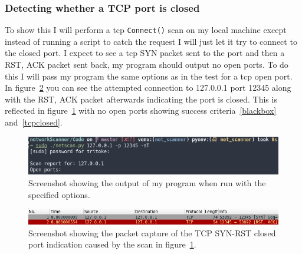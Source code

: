 \documentclass[titlepage]{article}
\let\Oldsubsubsection\subsubsection{}
\renewcommand{\subsubsection}{\FloatBarrier\Oldsubsubsection}
\begin{document}
\subsubsection{Detecting whether a TCP port is closed}
To show this I will perform a \gls{tcp} \verb|Connect()| scan
on my local machine except instead of running a script to catch the
request I will just let it try to connect to the closed port.
I expect to see a \gls{tcp} SYN packet sent to the port and then a RST, ACK
packet sent back, my program should output no open ports.
To do this I will pass my program the same options as in the test for
a \gls{tcp} open port.
In figure~\ref{tcpclosedpcap} you can see the attempted connection to
127.0.0.1 port 12345 along with the RST, ACK packet afterwards indicating
the port is closed. This is reflected in figure~\ref{tcpclosedoutput}
with no open ports showing success criteria~\ref{blackbox} and~\ref{tcpclosed}.
\begin{figure}[H]
  \centering
  \includegraphics[width=\textwidth]{screenshots/tcpclosedoutput.png}
  \caption{%
    Screenshot showing the output of my program when run with the specified options.
  }\label{tcpclosedoutput}
\end{figure}

\begin{figure}[H]
  \centering
  \includegraphics[width=\textwidth]{screenshots/tcpclosedpcap.png}
  \caption{%
    Screenshot showing the packet capture of the TCP SYN-RST closed port indication
    caused by the scan in figure~\ref{tcpclosedoutput}.
  }\label{tcpclosedpcap}
\end{figure}
\end{document}
